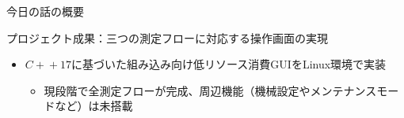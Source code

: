 \documentclass[10pt,aspectratio=169]{beamer}
\begin{document}
\begin{frame}[t]{今日の話の概要}
  \begin{block}{プロジェクト成果：三つの測定フローに対応する操作画面の実現}
    \begin{itemize}
      \item $C\!+\!+17$に基づいた組み込み向け低リソース消費GUIをLinux環境で実装
      \begin{itemize}
        \item 現段階で全測定フローが完成、周辺機能（機械設定やメンテナンスモードなど）は未搭載
      \end{itemize}
    \end{itemize}
  \end{block}

\end{frame}

\end{document}
